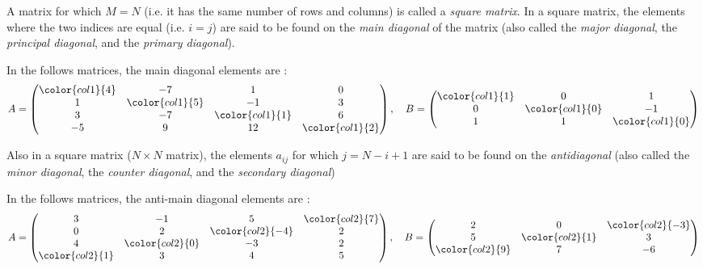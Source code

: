 A matrix for which $M=N$ (i.e. it has the same number of rows and columns) is called a \emph{square matrix}. In a square matrix, the elements where the two indices are equal (i.e. $i=j$) are said to be found on the \emph{main diagonal} of the matrix (also called the \emph{major diagonal}, the \emph{principal diagonal}, and the \emph{primary diagonal}).
\begin{example}
  
  In the follows matrices, the main diagonal elements are \color{col1}{highlighted}\color{black}:
  \begin{equation*}
	A=\begin{pmatrix}
	  \color{col1}{4} & -7 & 1 & 0\\
	  1 & \color{col1}{5} & -1 & 3\\
	  3 & -7 & \color{col1}{1} & 6\\
	  -5 & 9 & 12 & \color{col1}{2}\\
	\end{pmatrix},\quad
	B=\begin{pmatrix}
	  \color{col1}{1} & 0 & 1\\
	  0 & \color{col1}{0} & -1\\
	  1 & 1 & \color{col1}{0}\\
	\end{pmatrix}
  \end{equation*}
\end{example}

Also in a square matrix ($N\times N$ matrix), the elements $a_{ij}$ for which $j=N-i+1$ are said to be found on the \emph{antidiagonal} (also called the \emph{minor diagonal}, the \emph{counter diagonal}, and the \emph{secondary diagonal})\begin{example}
  
  In the follows matrices, the anti-main diagonal elements are \color{col2}{highlighted}\color{black}:
  \begin{equation*}
	A=
	\begin{pmatrix}
	  3 & -1 & 5 & \color{col2}{7}\\
	  0 & 2 & \color{col2}{-4} & 2\\
	  4 & \color{col2}{0} & -3 & 2\\
	  \color{col2}{1} & 3 & 4 & 5\\
	\end{pmatrix},\quad
	B=
	\begin{pmatrix}
	  2 & 0 & \color{col2}{-3}\\
	  5 & \color{col2}{1} & 3\\
	  \color{col2}{9} & 7 & -6\\
	\end{pmatrix}
  \end{equation*}
\end{example}

